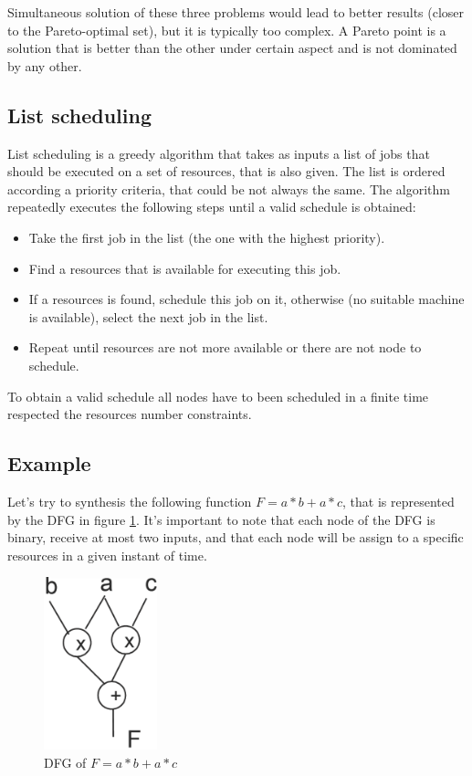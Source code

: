 Simultaneous solution of these three problems would lead to better results (closer to the Pareto-optimal set), but it is typically too complex.
A Pareto point is a solution that is better than the other under certain aspect and is not dominated by any other.

\subsection{List scheduling}
\label{list_scheduling}

List scheduling is a greedy algorithm that takes as inputs a list of jobs that should be executed on a set of resources, that is also given. The list is ordered according a priority criteria, that could be not always the same. The algorithm repeatedly executes the following steps until a valid schedule is obtained:
\begin{itemize}
    \item Take the first job in the list (the one with the highest priority).
    \item Find a resources that is available for executing this job.
    \item If a resources is found, schedule this job on it, otherwise (no suitable machine is available), select the next job in the list.
    \item Repeat until resources are not more available or there are not node to schedule.
\end{itemize}

To obtain a valid schedule all nodes have to been scheduled in a finite time respected the resources number constraints.

\subsection{Example}
Let's try to synthesis the following function $F = a*b + a*c$, that is represented by the DFG in figure \ref*{fig:DFG}. It's important to note that each node of the DFG is binary, receive at most two inputs, and that each node will be assign to a specific resources in a given instant of time.

\begin{figure}[h]
\centering
\includegraphics[height=5cm]{chapters/figures/dfg.png}
\caption{DFG of $F = a*b + a*c$}
\label{fig:DFG}
\end{figure}

